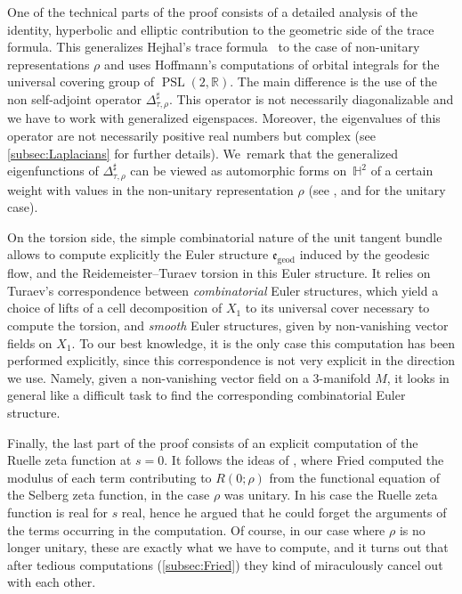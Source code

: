 \documentclass[10pt]{amsart}
\theoremstyle{plain}
\theoremstyle{definition}
\theoremstyle{remark}
\newcommand{\R}{\mathbb{R}}
\renewcommand{\H}{\mathbb{H}}
\newcommand{\geod}{\mathrm{geod}}
\DeclareMathOperator{\PSL}{PSL}
\numberwithin{equation}{section}
\begin{document}
One of the technical parts of the proof consists of a detailed analysis of the identity, hyperbolic and elliptic contribution to the geometric side of the trace formula. This generalizes Hejhal's trace formula~\cite[Ch.\,9, Th.\,6.2]{He2} to the case of non-unitary representations $\rho$ and uses Hoffmann's computations of orbital integrals for the universal covering group of $\PSL(2,\R)$. The main difference is the use of the non self-adjoint oper\-ator $\Delta_{\tau,\rho}^\sharp$. This operator is not necessarily diagonalizable and we have to work with generalized eigenspaces. Moreover, the eigenvalues of this operator are not necessarily positive real numbers but complex (see \cref{subsec:Laplacians} for further details).
We~remark that the generalized eigenfunctions of $\Delta_{\tau,\rho}^\sharp$ can be viewed as automorphic forms on~$\H^2$ of a certain weight with values in the non-unitary representation $\rho$ (see \cite[Ch.\,9]{He2}, and \cite{Hof94} for the unitary case).

On the torsion side, the simple combinatorial nature of the unit tangent bundle allows to compute explicitly the Euler structure $\mathfrak e_{\geod}$ induced by the geodesic flow, and the Reidemeister--Turaev torsion in this Euler structure. It relies on Turaev's correspondence between \emph{combinatorial} Euler structures, which yield a choice of lifts of a cell decomposition of $X_1$ to its universal cover necessary to compute the torsion, and \emph{smooth} Euler structures, given by non-vanishing vector fields on $X_1$.
To our best knowledge, it is the only case this computation has been performed explicitly, since this correspondence is not very explicit in the direction we use. Namely, given a non-vanishing vector field on a 3\nobreakdash-manifold $M$, it looks in general like a difficult task to find the corresponding combinatorial Euler structure.

Finally, the last part of the proof consists of an explicit computation of the Ruelle zeta function at $s=0$. It follows the ideas of \cite[\S 3]{fried1986fuchsian}, where Fried computed the modulus of each term contributing to $R(0;\rho)$ from the functional equation of the Selberg zeta function, in the case $\rho$ was unitary. In his case the Ruelle zeta function is real for $s$ real, hence he argued that he could forget the arguments of the terms occurring in the computation. Of course, in our case where $\rho$ is no longer unitary, these are exactly what we have to compute, and it turns out that after tedious computations (\cref{subsec:Fried}) they kind of miraculously cancel out with each other.
\end{document}
